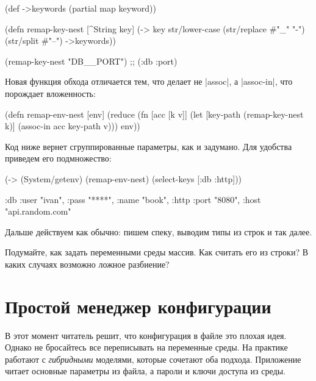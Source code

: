 \begin{english}
  \begin{clojure}
(def ->keywords (partial map keyword))

(defn remap-key-nest
  [^String key]
  (-> key
      str/lower-case
      (str/replace #"_" "-")
      (str/split #"--")
      ->keywords))

(remap-key-nest "DB__PORT")
;; (:db :port)
  \end{clojure}
\end{english}

Новая функция обхода отличается тем, что делает не \spverb|assoc|, а
\spverb|assoc-in|, что порождает вложенность:

\begin{english}
  \begin{clojure}
(defn remap-env-nest
  [env]
  (reduce
   (fn [acc [k v]]
     (let [key-path (remap-key-nest k)]
       (assoc-in acc key-path v)))
   {}
   env))
  \end{clojure}
\end{english}

Код ниже вернет сгруппированные параметры, как и задумано. Для удобства приведем
его подмножество:

\begin{english}
  \begin{clojure}
(-> (System/getenv)
    (remap-env-nest)
    (select-keys [:db :http]))

{:db {:user "ivan", :pass "****", :name "book"},
 :http {:port "8080", :host "api.random.com"}}
  \end{clojure}
\end{english}

\noindent
Дальше действуем как обычно: пишем спеку, выводим типы из строк и так далее.

Подумайте, как задать переменными среды массив. Как считать его из строки? В
каких случаях возможно ложное разбиение?

\section{Простой менеджер конфигурации}

В этот момент читатель решит, что конфигурация в файле это плохая идея. Однако
не бросайтесь все переписывать на переменные среды. На практике работают с
\emph{гибридными} моделями, которые сочетают оба подхода. Приложение читает
основные параметры из файла, а пароли и ключи доступа из среды.

